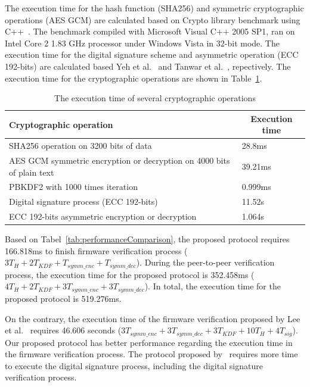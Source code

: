 The execution time for the hash function (SHA256) and symmetric cryptographic operations (AES GCM) are calculated based on Crypto library benchmark using C++~\cite{cryptolib}. The benchmark compiled with Microsoft Visual C++ 2005 SP1, ran on Intel Core 2 1.83 GHz processor under Windows Vista in 32-bit mode. The execution time for the digital signature scheme and asymmetric operation (ECC 192-bits) are calculated based Yeh et al.~\cite{signatureScheme} and Tanwar et al.~\cite{asymmetricScheme}, repectively. The execution time for the cryptographic operations are shown in Table~\ref{tab:executionTime}. 

\begin{table}[H]
	\caption{The execution time of several cryptographic operations}
	\label{tab:executionTime}
	\begin{adjustbox}{max width=1\textwidth}
		\begin{tabular}{ll}
			\hline
			\textbf{Cryptographic operation} & \multicolumn{1}{c}{\textbf{Execution time}} \\ \hline
			SHA256 operation on 3200 bits of data & 28.8ms\\
			AES GCM symmetric encryption or decryption on 4000 bits of plain text & 39.21ms\\
			PBKDF2 with 1000 times iteration &  0.999ms\\
			Digital signature process (ECC 192-bits) & 11.52s \\
			ECC 192-bits asymmetric encryption or decryption & 1.064s \\
		\end{tabular}
	\end{adjustbox}
\end{table}

Based on Tabel~\ref{tab:performanceComparison}, the proposed protocol requires 166.818ms to finish firmware verification process ($3T_H+2T_{KDF}+T_{symm\_enc}+T_{symm\_dec}$). During the peer-to-peer verification process, the execution time for the proposed protocol is 352.458ms ($4T_H+2T_{KDF}+3T_{symm\_enc}+3T_{symm\_dec}$). In total, the execution time for the proposed protocol is 519.276ms.

On the contrary, the execution time of the firmware verification proposed by Lee et al.~\cite{lee} requires 46.606 seconds ($3T_{symm\_enc}+3T_{symm\_dec}+3T_{KDF}+10T_H+4T_{sig}$). Our proposed protocol has better performance regarding the execution time in the firmware verification process. The protocol proposed by~\cite{lee} requires more time to execute the digital signature process, including the digital signature verification process.

